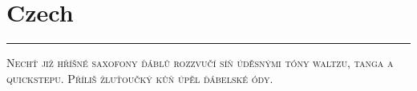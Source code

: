 \vspace{-1em}\section*{\checkyes Czech}
\vspace{-.5em}\hrule\vspace{.5em}
\noindent\textsc{Nechť již hříšné saxofony ďáblů rozzvučí síň úděsnými 
tóny waltzu, tanga a quickstepu. Příliš žluťoučký kůň úpěl ďábelské ódy.}
